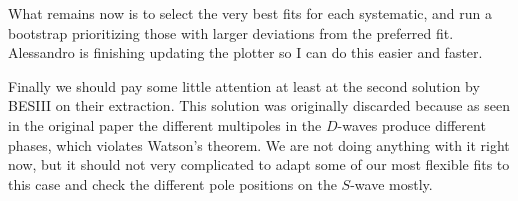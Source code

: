 \begin{todolist}
\item What remains now is to select the very best fits for each systematic, and run a bootstrap prioritizing those with larger deviations from the preferred fit. Alessandro is finishing updating the plotter so I can do this easier and faster.

\item Finally we should pay some little attention at least at the second solution by BESIII on their extraction. This solution was originally discarded because as seen in the original paper the different multipoles in the $D$-waves produce different phases, which violates Watson's theorem. We are not doing anything with it right now, but it should not very complicated to adapt some of our most flexible fits to this case and check the different pole positions on the $S$-wave mostly. 

  \end{todolist}